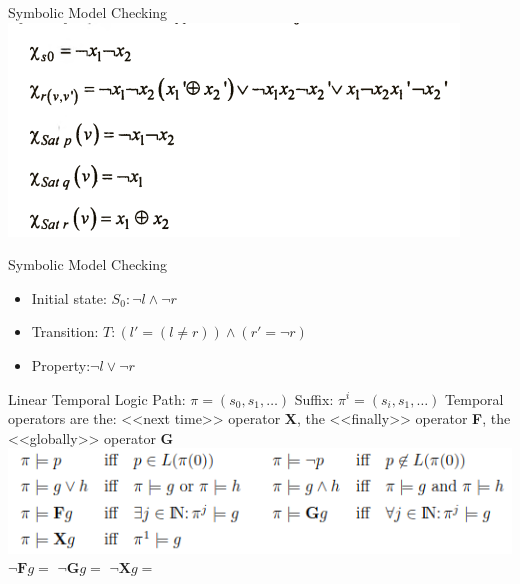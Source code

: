 \documentclass{beamer}
\begin{document}
\begin{frame}{Symbolic Model Checking}
\includegraphics[scale=0.5]{smb_ex_formula.png}
\end{frame}

\begin{frame}{Symbolic Model Checking}
\begin{itemize}
\item Initial state: $S_0: \lnot l \wedge \lnot r$
\item Transition: $T: (l' = (l\neq r)) \wedge (r' = \lnot r)$
\item Property:$ \lnot l \vee \lnot r$
\end{itemize}
\end{frame}

\begin{frame}{Linear Temporal Logic}
Path: $\pi = (s_0, s_1, \dots )$\newline
Suffix: $\pi^i = (s_i, s_1, \dots )$\newline
Temporal operators are the: <<next time>> operator \textbf{X}, the <<finally>> operator \textbf{F}, the <<globally>> operator \textbf{G}\newline
\includegraphics[scale=0.5]{ltl.png}\newline
$\lnot \textbf{F}g = $\newline
$\lnot \textbf{G}g = $\newline
$\lnot \textbf{X}g = $
\end{frame}
\end{document}
